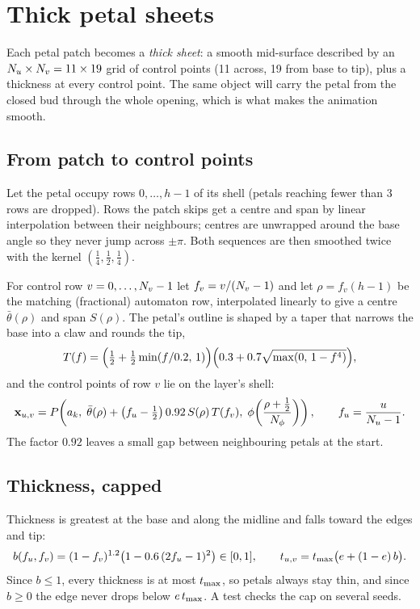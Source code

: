 \section{Thick petal sheets}\label{sec:sheets}

Each petal patch becomes a \emph{thick sheet}: a smooth mid-surface described by
an $N_u \times N_v = 11 \times 19$ grid of control points (11 across, 19 from
base to tip), plus a thickness at every control point. The same object will carry
the petal from the closed bud through the whole opening, which is what makes
the animation smooth.

\subsection{From patch to control points}
Let the petal occupy rows $0,\dots,h-1$ of its shell (petals reaching fewer than
3 rows are dropped). Rows the patch skips get a centre and span by linear
interpolation between their neighbours; centres are unwrapped around the base
angle so they never jump across $\pm\pi$. Both sequences are then smoothed twice
with the kernel $(\tfrac14, \tfrac12, \tfrac14)$.

For control row $v = 0,\dots,N_v-1$ let $f_v = v/(N_v-1)$ and let $\rho = f_v(h-1)$
be the matching (fractional) automaton row, interpolated linearly to give a
centre $\bar\theta(\rho)$ and span $S(\rho)$. The petal's outline is shaped by a
taper that narrows the base into a claw and rounds the tip,
\[
  T(f) = \Bigl(\tfrac12 + \tfrac12\min(f/0.2,\,1)\Bigr)\Bigl(0.3 + 0.7\sqrt{\max(0,\,1 - f^4)}\Bigr),
\]
and the control points of row $v$ lie on the layer's shell:
\[
  \mathbf{x}_{u,v} = P\!\left(a_k,\; \bar\theta(\rho) + \bigl(f_u - \tfrac12\bigr)\,0.92\,S(\rho)\,T(f_v),\; \phi\!\left(\frac{\rho + \frac12}{N_\phi}\right)\right),
  \qquad f_u = \frac{u}{N_u - 1}.
\]
The factor $0.92$ leaves a small gap between neighbouring petals at the start.

\subsection{Thickness, capped}
Thickness is greatest at the base and along the midline and falls toward the
edges and tip:
\[
  b(f_u, f_v) = (1 - f_v)^{1.2}\bigl(1 - 0.6\,(2f_u - 1)^2\bigr) \in [0,1],
  \qquad
  t_{u,v} = t_{\max}\bigl(e + (1-e)\,b\bigr).
\]
Since $b \le 1$, every thickness is at most $t_{\max}$, so petals always stay
thin, and since $b\ge0$ the edge never drops below $e\,t_{\max}$. A test checks
the cap on several seeds.

